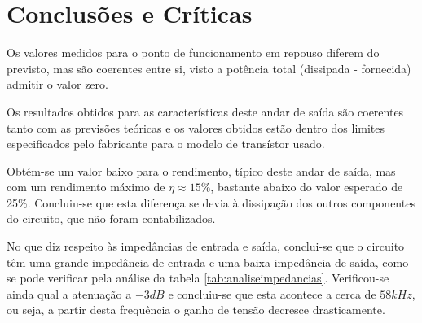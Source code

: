 \documentclass[%
  reprint,
  nofootinbib,
  amsmath,amssymb,
  aps,
  10pt,
  a4paper
]{revtex4-1}
\begin{document}

\section{Conclusões e Críticas}
\label{s:conclu}
Os valores medidos para o ponto de funcionamento em repouso diferem do previsto, mas são coerentes entre si, visto a potência total (dissipada - fornecida) admitir o valor zero.

Os resultados obtidos para as características deste andar de saída são coerentes tanto com as previsões teóricas  e os valores obtidos estão dentro dos limites especificados pelo fabricante para o modelo de transístor usado.

Obtém-se um valor baixo para o rendimento, típico deste andar de saída, mas com um rendimento máximo de $\eta\approx15\%$,  bastante abaixo do valor esperado de 25\%. Concluiu-se que esta diferença se devia à dissipação dos outros componentes do circuito, que não foram contabilizados.

No que diz respeito às impedâncias de entrada e saída, conclui-se que o circuito têm uma grande impedância de entrada e uma baixa impedância de saída, como se pode verificar pela análise da tabela \ref{tab:analiseimpedancias}.
Verificou-se ainda qual a atenuação a $-3dB$ e concluiu-se que esta acontece a cerca de $58kHz$, ou seja, a partir desta frequência o ganho de tensão decresce drasticamente.



\nocite{*}
{}
\end{document}
